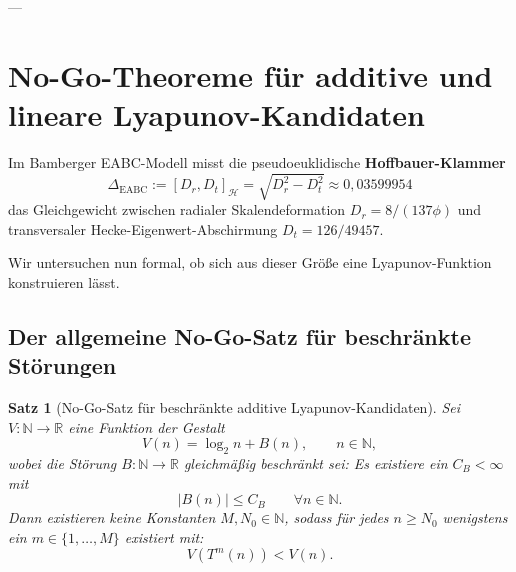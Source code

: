 \documentclass[11pt,reqno]{amsart}
\newtheorem{theorem}{Satz}[section]
\theoremstyle{definition}
\theoremstyle{remark}
\numberwithin{equation}{section}
\begin{document}
---

\section{No-Go-Theoreme für additive und lineare Lyapunov-Kandidaten}

Im Bamberger EABC-Modell misst die pseudoeuklidische \textbf{Hoffbauer-Klammer}
\begin{equation}
\Delta_{\mathrm{EABC}} := [D_r, D_t]_{\mathcal{H}} = \sqrt{D_r^2 - D_t^2} \approx 0{,}03599954
\end{equation}
das Gleichgewicht zwischen radialer Skalendeformation $D_r = 8/(137\phi)$ und transversaler Hecke-Eigenwert-Abschirmung $D_t = 126/49457$.

Wir untersuchen nun formal, ob sich aus dieser Größe eine Lyapunov-Funktion konstruieren lässt.

\subsection{Der allgemeine No-Go-Satz für beschränkte Störungen}

\begin{theorem}[No-Go-Satz für beschränkte additive Lyapunov-Kandidaten]
\label{thm:nogo_lyapunov}
Sei $V: \mathbb{N} \to \mathbb{R}$ eine Funktion der Gestalt
\begin{equation}
V(n) = \log_2 n + B(n), \qquad n \in \mathbb{N},
\end{equation}
wobei die Störung $B: \mathbb{N} \to \mathbb{R}$ gleichmäßig beschränkt sei: Es existiere ein $C_B < \infty$ mit
\begin{equation}
|B(n)| \le C_B \qquad \forall n \in \mathbb{N}.
\end{equation}
Dann existieren keine Konstanten $M, N_0 \in \mathbb{N}$, sodass für jedes $n \ge N_0$ wenigstens ein $m \in \{1, \dots, M\}$ existiert mit:
\begin{equation}
V(T^m(n)) < V(n).
\end{equation}
\end{theorem}
\end{document}
